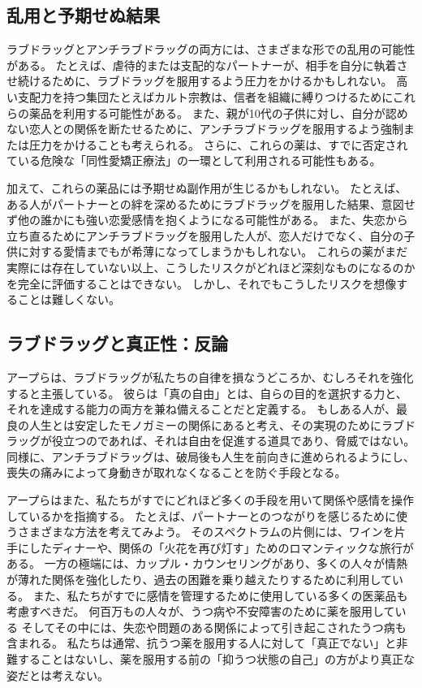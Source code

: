 \documentclass[paper=a4,book,openany]{jlreq} \usepackage{mystyle}
\begin{document}
\subsection{乱用と予期せぬ結果}

ラブドラッグとアンチラブドラッグの両方には、さまざまな形での乱用の可能性がある。
たとえば、虐待的または支配的なパートナーが、相手を自分に執着させ続けるために、ラブドラッグを服用するよう圧力をかけるかもしれない。
高い支配力を持つ集団{\DDASH}たとえばカルト宗教{\DDASH}は、信者を組織に縛りつけるためにこれらの薬品を利用する可能性がある。
また、親が10代の子供に対し、自分が認めない恋人との関係を断たせるために、アンチラブドラッグを服用するよう強制または圧力をかけることも考えられる。
さらに、これらの薬は、すでに否定されている危険な「同性愛矯正療法」の一環として利用される可能性もある。

加えて、これらの薬品には予期せぬ副作用が生じるかもしれない。
たとえば、ある人がパートナーとの絆を深めるためにラブドラッグを服用した結果、意図せず他の誰かにも強い恋愛感情を抱くようになる可能性がある。
また、失恋から立ち直るためにアンチラブドラッグを服用した人が、恋人だけでなく、自分の子供に対する愛情までもが希薄になってしまうかもしれない。
これらの薬がまだ実際には存在していない以上、こうしたリスクがどれほど深刻なものになるのかを完全に評価することはできない。
しかし、それでもこうしたリスクを想像することは難しくない。

\subsection{ラブドラッグと真正性：反論}

アープらは、ラブドラッグが私たちの自律を損なうどころか、むしろそれを強化すると主張している。
彼らは「真の自由」とは、自らの目的を選択する力と、それを達成する能力の両方を兼ね備えることだと定義する。
もしある人が、最良の人生とは安定したモノガミーの関係にあると考え、その実現のためにラブドラッグが役立つのであれば、それは自由を促進する道具であり、脅威ではない。
同様に、アンチラブドラッグは、破局後も人生を前向きに進められるようにし、喪失の痛みによって身動きが取れなくなることを防ぐ手段となる。

アープらはまた、私たちがすでにどれほど多くの手段を用いて関係や感情を操作しているかを指摘する。
たとえば、パートナーとのつながりを感じるために使うさまざまな方法を考えてみよう。
そのスペクトラムの片側には、ワインを片手にしたディナーや、関係の「火花を再び灯す」ためのロマンティックな旅行がある。
一方の極端には、カップル・カウンセリングがあり、多くの人々が情熱が薄れた関係を強化したり、過去の困難を乗り越えたりするために利用している。
また、私たちがすでに感情を管理するために使用している多くの医薬品も考慮すべきだ。
何百万もの人々が、うつ病や不安障害のために薬を服用している{\DDASH}
そしてその中には、失恋や問題のある関係によって引き起こされたうつ病も含まれる。
私たちは通常、抗うつ薬を服用する人に対して「真正でない」と非難することはないし、薬を服用する前の「抑うつ状態の自己」の方がより真正な姿だとは考えない。
\end{document}
